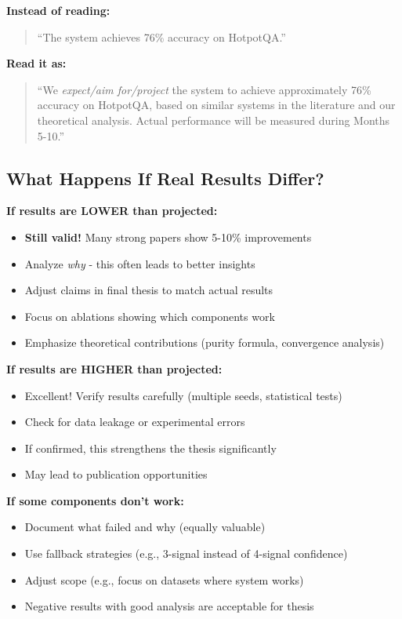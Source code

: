 \documentclass[12pt,a4paper]{article}
\theoremstyle{definition}
\begin{document}
\begin{tcolorbox}[
    colback=yellow!10!white,
    colframe=orange!75!black,
    title={\Large\textbf{IMPORTANT: About the Numbers in This Document}},
    breakable,
    enhanced,
    fontupper=\normalsize
]
\textbf{Instead of reading:}
\begin{quote}
``The system achieves 76\% accuracy on HotpotQA.''
\end{quote}

\textbf{Read it as:}
\begin{quote}
``We \textit{expect/aim for/project} the system to achieve approximately 76\% accuracy on HotpotQA, based on similar systems in the literature and our theoretical analysis. Actual performance will be measured during Months 5-10.''
\end{quote}

\subsection*{What Happens If Real Results Differ?}

\textbf{If results are LOWER than projected:}
\begin{itemize}
    \item \textbf{Still valid!} Many strong papers show 5-10\% improvements
    \item Analyze \textit{why} - this often leads to better insights
    \item Adjust claims in final thesis to match actual results
    \item Focus on ablations showing which components work
    \item Emphasize theoretical contributions (purity formula, convergence analysis)
\end{itemize}

\textbf{If results are HIGHER than projected:}
\begin{itemize}
    \item Excellent! Verify results carefully (multiple seeds, statistical tests)
    \item Check for data leakage or experimental errors
    \item If confirmed, this strengthens the thesis significantly
    \item May lead to publication opportunities
\end{itemize}

\textbf{If some components don't work:}
\begin{itemize}
    \item Document what failed and why (equally valuable)
    \item Use fallback strategies (e.g., 3-signal instead of 4-signal confidence)
    \item Adjust scope (e.g., focus on datasets where system works)
    \item Negative results with good analysis are acceptable for thesis
\end{itemize}


\end{tcolorbox}
\end{document}
